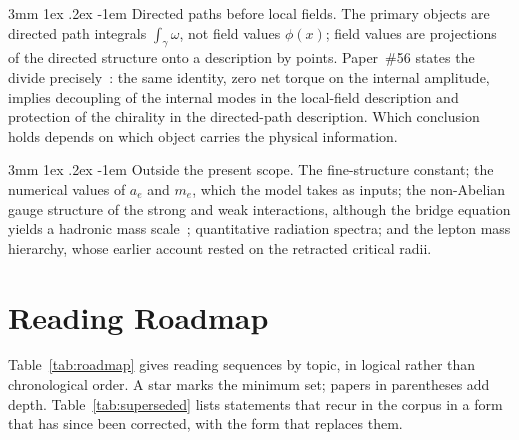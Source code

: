\documentclass[%
 reprint, amsmath,amssymb, aps, prb, ]{revtex4-2}
\makeatletter
\numberwithin{equation}{section}
\renewcommand\paragraph{%
  \@startsection{paragraph}{4}{\z@}%
    {3mm \@plus 1ex \@minus .2ex}%
    {-1em}%
    {\normalfont\normalsize\itshape}}
\makeatother
\begin{document}
\paragraph{Directed paths before local fields.} The primary objects are directed path integrals $\int_\gamma\omega$, not field values $\phi(x)$; field values are projections of the directed structure onto a description by points. Paper~\#56 states the divide precisely~\cite{hanamura56}: the same identity, zero net torque on the internal amplitude, implies decoupling of the internal modes in the local-field description and protection of the chirality in the directed-path description. Which conclusion holds depends on which object carries the physical information.

\paragraph{Outside the present scope.} The fine-structure constant; the numerical values of $a_e$ and $m_e$, which the model takes as inputs; the non-Abelian gauge structure of the strong and weak interactions, although the bridge equation yields a hadronic mass scale~\cite{hanamura61}; quantitative radiation spectra; and the lepton mass hierarchy, whose earlier account rested on the retracted critical radii.

\section{Reading Roadmap}
\label{sec:roadmap}

Table~\ref{tab:roadmap} gives reading sequences by topic, in logical rather than chronological order. A star marks the minimum set; papers in parentheses add depth. Table~\ref{tab:superseded} lists statements that recur in the corpus in a form that has since been corrected, with the form that replaces them.
\end{document}
